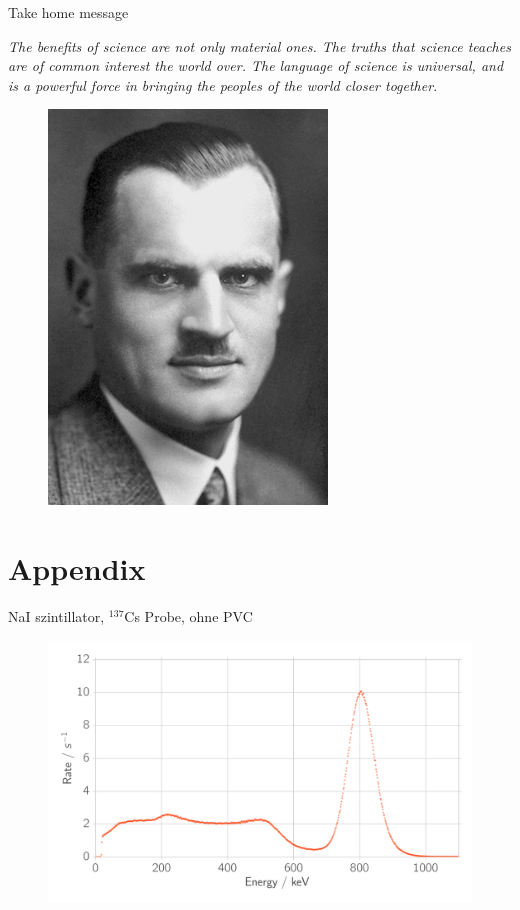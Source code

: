 \documentclass[xcolor=x11names,compress]{beamer}
\renewcommand{\(}{\begin{columns}}
\renewcommand{\)}{\end{columns}}
\newcommand{\<}[1]{\begin{column}{#1}}
\renewcommand{\>}{\end{column}}
\begin{document}
\begin{frame}[t]{Take home message}

    \emph{ The benefits of science are not only material ones. The truths that science teaches are of common interest the world over. The language of science is universal, and is a powerful force in bringing the peoples of the world closer together. }
\begin{figure}[htpb]
    \centering
    \includegraphics[width=0.3\linewidth]{../figures/compton}
\label{fig:fratze}
\end{figure}
   
\end{frame}

\section{Appendix}
\label{sec:appendix}
\begin{frame}[t]{NaI szintillator, $^{137}$Cs Probe, ohne PVC}
 \begin{figure}[htpb]
    \centering
    \includegraphics[width=1.0\linewidth]{../analysis/figures/na_total_incident}
    \label{fig:histo_na_137cs}
\end{figure}
\end{frame}
\end{document}

